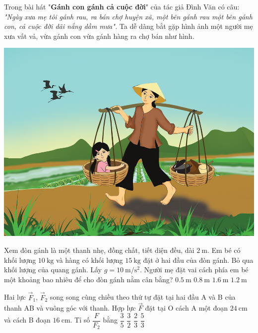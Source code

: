 \begin{ex}
	Trong bài hát "\textbf{Gánh con gánh cả cuộc đời}" của tác giả Đình Văn có câu: \textit{"Ngày xưa mẹ tôi gánh rau, ra bán chợ huyện xã, một bên gánh rau một bên gánh con, cả cuộc đời dãi nắng dầm mưa".} Ta dễ dàng bắt gặp hình ảnh một người mẹ xưa vất vả, vừa gánh con vừa gánh hàng ra chợ bán như hình.
	\begin{center}
		\includegraphics[width=0.3\linewidth]{../figs/VN10-2023-PH-TP022-P-2}
	\end{center}
	 Xem đòn gánh là một thanh nhẹ, đồng chất, tiết diện đều, dài $\SI{2}{\meter}$. Em bé có khối lượng $\SI{10}{\kilogram}$ và hàng có khối lượng $\SI{15}{\kilogram}$ đặt ở hai đầu của đòn gánh. Bỏ qua khối lượng của quang gánh. Lấy $g=\SI{10}{\meter/\second^2}$. Người mẹ đặt vai cách phía em bé một khoảng bao nhiêu để cho đòn gánh nằm cân bằng?
	\choice
	{$\SI{0.5}{\meter}$}
	{$\SI{0.8}{\meter}$}
	{$\SI{1.6}{\meter}$}
	{\True $\SI{1.2}{\meter}$}
\end{ex}
\begin{ex}
	Hai lực $\vec{F}_1$, $\vec{F}_2$ song song cùng chiều theo thứ tự đặt tại hai đầu A và B của thanh AB và vuông góc với thanh. Hợp lực $\vec{F}$ đặt tại O cách A một đoạn $\SI{24}{\centi\meter}$ và cách B đoạn $\SI{16}{\centi\meter}$. Tỉ số $\dfrac{F}{F_2}$ bằng
	\choice
	{$\dfrac{3}{5}$}
	{$\dfrac{3}{2}$}
	{$\dfrac{2}{3}$}
	{\True $\dfrac{5}{3}$}
\end{ex}
